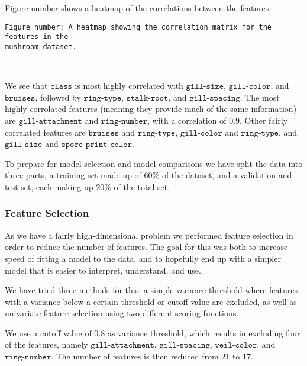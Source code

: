 \documentclass[11pt]{article}
\begin{document}
    Figure number shows a heatmap of the correlations between the features.


    \begin{Verbatim}[commandchars=\\\{\}]
Figure number: A heatmap showing the correlation matrix for the features in the
mushroom dataset.
    \end{Verbatim}

    \begin{center}
    \end{center}
    { \hspace*{\fill} \\}
    
    We see that \(\texttt{class}\) is most highly correlated with
\(\texttt{gill-size}\), \(\texttt{gill-color}\), and
\(\texttt{bruises}\), followed by \(\texttt{ring-type}\),
\(\texttt{stalk-root}\), and \(\texttt{gill-spacing}\). The most highly
corrolated features (meaning they provide much of the same information)
are \(\texttt{gill-attachment}\) and \(\texttt{ring-number}\), with a
correlation of 0.9. Other fairly correlated features are
\(\texttt{bruises}\) and \(\texttt{ring-type}\), \(\texttt{gill-color}\)
and \(\texttt{ring-type}\), and \(\texttt{gill-size}\) and
\(\texttt{spore-print-color}\).

To prepare for model selection and model comparisons we have split the data into three parts, a training set made up of $60 \%$ of the dataset, and a validation and test set, each making up $20 \%$ of the total set.

    \hypertarget{feature-selection}{%
\subsubsection{Feature Selection}\label{feature-selection}}

As we have a fairly high-dimensional problem we performed feature
selection in order to reduce the number of features. The goal for this
was both to increase speed of fitting a model to the data, and to
hopefully end up with a simpler model that is easier to interpret,
understand, and use.

We have tried three methods for this; a simple variance threshold where
features with a variance below a certain threshold or cutoff value are
excluded, as well as univariate feature selection using two different
scoring functions.

We use a cutoff value of 0.8 as variance threshold, which results in
excluding four of the features, namely \(\texttt{gill-attachment}\),
\(\texttt{gill-spacing}\), \(\texttt{veil-color}\), and
\(\texttt{ring-number}\). The number of features is then reduced from 21
to 17.
        
\end{document}
